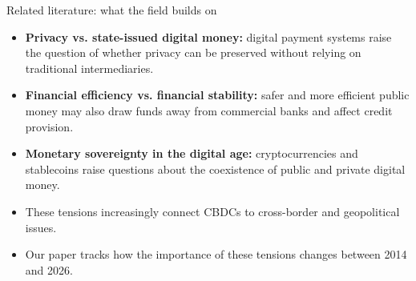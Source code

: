 \documentclass[aspectratio=169,10pt]{beamer}
\begin{document}
\begin{frame}{Related literature: what the field builds on}
\begin{itemize}
\item \textbf{Privacy vs. state-issued digital money:} digital payment systems raise the question of whether privacy can be preserved without relying on traditional intermediaries.

\item \textbf{Financial efficiency vs. financial stability:} safer and more efficient public money may also draw funds away from commercial banks and affect credit provision.

\item \textbf{Monetary sovereignty in the digital age:} cryptocurrencies and stablecoins raise questions about the coexistence of public and private digital money.

\item[$\Rightarrow$] These tensions increasingly connect CBDCs to cross-border and geopolitical issues.

\item[$\Rightarrow$] Our paper tracks how the importance of these tensions changes between 2014 and 2026.

\end{itemize}
\end{frame}
\end{document}
